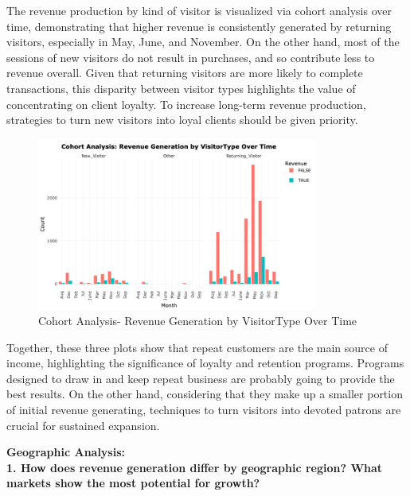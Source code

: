 \documentclass[12pt]{article}
\begin{document}
The revenue production by kind of visitor is visualized via cohort analysis over time, demonstrating that higher revenue is consistently generated by returning visitors, especially in May, June, and November. On the other hand, most of the sessions of new visitors do not result in purchases, and so contribute less to revenue overall. Given that returning visitors are more likely to complete transactions, this disparity between visitor types highlights the value of concentrating on client loyalty. To increase long-term revenue production, strategies to turn new visitors into loyal clients should be given priority.
\begin{figure}[h]
    \centering
    \includegraphics[width=0.82\textwidth]{Cohort Analysis- Revenue Generation by VisitorType Over Time.png}  
    \caption{Cohort Analysis- Revenue Generation by VisitorType Over Time}
\end{figure}
\vspace{0.5cm}

\FloatBarrier
Together, these three plots show that repeat customers are the main source of income, highlighting the significance of loyalty and retention programs. Programs designed to draw in and keep repeat business are probably going to provide the best results. On the other hand, considering that they make up a smaller portion of initial revenue generating, techniques to turn visitors into devoted patrons are crucial for sustained expansion.
\vspace{0.5cm}


\textbf{Geographic Analysis:}\\

\textbf{1. How does revenue generation differ by geographic region? What markets show the most potential for growth?} \\[5pt] %

\FloatBarrier
\end{document}
